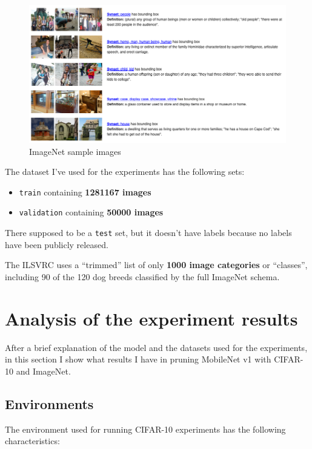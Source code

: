\begin{figure}[ht]
    \includegraphics[width=\textwidth]{images/experiments/imagenet.png}
    \centering
    \caption{ImageNet sample images}\label{fig:imagenet}
\end{figure}

The dataset I've used for the experiments has the following sets:

\begin{itemize}
    \item \texttt{train} containing \textbf{1281167 images}
    \item \texttt{validation} containing \textbf{50000 images}
\end{itemize}

There supposed to be a \texttt{test} set, but it doesn't have labels because no
labels have been publicly released.

The ILSVRC uses a ``trimmed'' list of only \textbf{1000 image categories} or
``classes'', including 90 of the 120 dog breeds classified by the full ImageNet
schema.

\section{Analysis of the experiment results}
After a brief explanation of the model and the datasets used for the
experiments, in this section I show what results I have in pruning MobileNet v1
with CIFAR-10 and ImageNet.

\subsection{Environments}
The environment used for running CIFAR-10 experiments has the following
characteristics:

